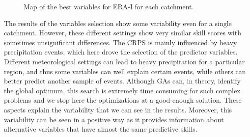 \documentclass[draft]{agujournal2019}
\begin{document}
\begin{figure}[hbt]
	\noindent{}
	\caption{Map of the best variables for ERA-I for each catchment.}
	\label{fig_map_variables}
\end{figure}

The results of the variables selection show some variability even for a single catchment. However, these different settings show very similar skill scores with sometimes unsignificant differences. The CRPS is mainly influenced by heavy precipitation events, which here drove the selection of the predictor variables. Different meteorological settings can lead to heavy precipitation for a particular region, and thus some variables can well explain certain events, while others can better predict another sample of events. Although GAs can, in theory, identify the global optimum, this search is extremely time consuming for such complex problems and we stop here the optimizations at a good-enough solution. These aspects explain the variability that we can see in the results. Moreover, this variability can be seen in a positive way as it provides information about alternative variables that have almost the same predictive skills.
\end{document}
